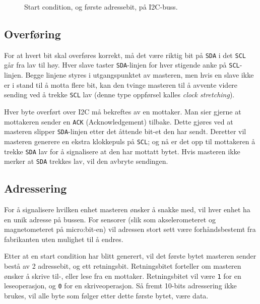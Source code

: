 \begin{figure}
{}
    \caption{ Start condition, og første adressebit, på I2C-buss.}
    \label{fig:app-startcond-I2C}
\end{figure}

\subsection*{Overføring}

For at hvert bit skal overføres korrekt, må det være riktig bit på \verb|SDA| i det \verb|SCL| går fra lav til høy. Hver slave taster \verb|SDA|-linjen for hver stigende anke på \verb|SCL|-linjen. Begge linjene styres i utgangspunktet av masteren, men hvis en slave ikke er i stand til å motta flere bit, kan den tvinge masteren til å avvente videre sending ved å trekke \verb|SCL| lav (denne type oppførsel kalles \textit{clock stretching}). 

Hver byte overført over I2C må bekreftes av en mottaker. Man sier gjerne at mottakeren sender en \verb|ACK| (Acknowledgement) tilbake. Dette gjøres ved at masteren slipper \verb|SDA|-linjen etter det åttende bit-et den har sendt. Deretter vil masteren generere en ekstra klokkepuls på \verb|SCL|; og nå er det opp til mottakeren å trekke \verb|SDA| lav for å signalisere at den har mottatt bytet. Hvis masteren ikke merker at \verb|SDA| trekkes lav, vil den avbryte sendingen.


\subsection*{Adressering}


For å signalisere hvilken enhet masteren ønsker å snakke med, vil hver enhet ha en unik adresse på bussen. For sensorer (slik som akselerometeret og magnetometeret på micro:bit-en) vil adressen stort sett være forhåndsbestemt fra fabrikanten uten mulighet til å endres.

Etter at en start condition har blitt generert, vil det første bytet masteren sender bestå av 2 adressebit, og ett retningsbit. Retningsbitet forteller om masteren ønsker å skrive til-, eller lese fra en mottaker. Retningsbitet vil være \verb|1| for en leseoperasjon, og \verb|0| for en skriveoperasjon. Så fremt 10-bits adressering ikke brukes, vil alle byte som følger etter dette første bytet, være data.

